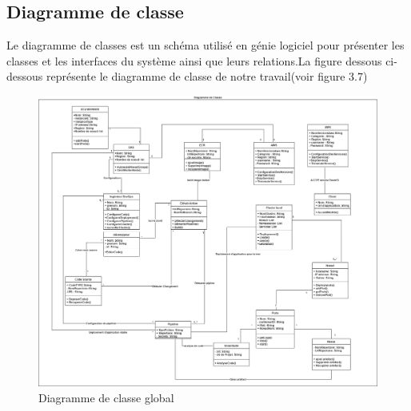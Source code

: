 \subsection{\Large Diagramme de classe}
\textsf{\selectfont{} Le diagramme de classes est un schéma utilisé en génie logiciel pour présenter les classes et les interfaces du système ainsi que leurs relations.La figure dessous ci-dessous représente le 
diagramme de classe de notre travail(voir figure 3.7)\cite{13}}
\begin{figure}[H]
  \begin{center}
  
      \includegraphics[width=18cm]{ClassDiagram.drawio.png}

  \end{center}
  
  \caption{Diagramme de classe global}
\end{figure}
